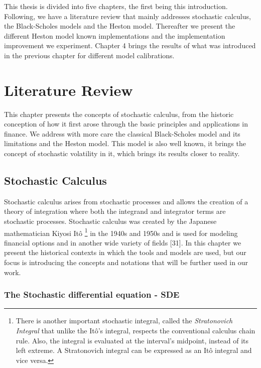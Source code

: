 \documentclass[12pt,twoside]{reedthesis}
\theoremstyle{definition}
\theoremstyle{definition}
\theoremstyle{remark}
\begin{document}
  This thesis is divided into five chapters, the first being this
  introduction. Following, we have a literature review that mainly
  addresses stochastic calculus, the Black-Scholes models and the Heston
  model. Thereafter we present the different Heston model known
  implementations and the implementation improvement we experiment.
  Chapter 4 brings the results of what was introduced in the previous
  chapter for different model calibrations.
  
  \chapter{Literature Review}\label{lt-review}
  
  This chapter presents the concepts of stochastic calculus, from the
  historic conception of how it first arose through the basic principles
  and applications in finance. We address with more care the classical
  Black-Scholes model and its limitations and the Heston model. This model
  is also well known, it brings the concept of stochastic volatility in
  it, which brings its results closer to reality.
  
  \section{Stochastic Calculus}\label{stochastic-calculus}
  
  Stochastic calculus arises from stochastic processes and allows the
  creation of a theory of integration where both the integrand and
  integrator terms are stochastic processes. Stochastic calculus was
  created by the Japanese mathematician Kiyosi Itô
  \footnote{There is another important stochastic integral, called the \textit{Stratonovich Integral} that unlike the Itô's integral, respects the conventional calculus chain rule. Also, the integral is evaluated at the interval's midpoint, instead of its left extreme. A Stratonovich integral can be expressed as an Itô integral and vice versa.}
  in the 1940s and 1950s and is used for modeling financial options and in
  another wide variety of fields {[}31{]}. In this chapter we present the
  historical contexts in which the tools and models are used, but our
  focus is introducing the concepts and notations that will be further
  used in our work.
  
  \subsection{The Stochastic differential equation -
  SDE}\label{the-stochastic-differential-equation---sde}
  
\end{document}
